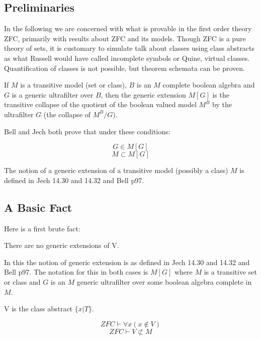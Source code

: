 \documentclass[10pt,titlepage]{article}
\begin{document}
\subsection{Preliminaries}

In the following we are concerned with what is provable in the first order theory ZFC, primarily with results about ZFC and its models.
Though ZFC is a pure theory of sets, it is customary to simulate talk about classes using class abstracts as what Russell would have called incomplete symbols or Quine, virtual classes. 
Quantification of classes is not possible, but theorem schemata can be proven.

If $M$ is a transitive model (set or class), $B$ is an $M$ complete boolean algebra and $G$ is a generic ultrafilter over $B$, then the generic extension $M[G]$ is the transitive collapse of the quotient of the boolean valued model $M^B$ by the ultrafilter $G$ (the collapse of $M^B/G$).
 
Bell and Jech both prove that under these conditions:

\begin{equation}
G \in M[G] \label{2}
\end{equation}
\begin{equation}
M \subset M[G] \label{3}
\end{equation}

The notion of a generic extension of a transitive model (possibly a class) $M$ is defined in Jech 14.30 and 14.32 and Bell p97.

\subsection{A Basic Fact}

Here is a first brute fact:

There are no generic extensions of V.

In this the notion of generic extension is as defined in Jech 14.30 and 14.32 and Bell p97.
The notation for this in both cases is $M[G]$ where $M$ is a transitive set or class and $G$ is an $M$ generic ultrafilter over some boolean algebra complete in $M$.
 
V is the class abstract $\{x | T\}$.

\begin{equation}
ZFC \vdash \forall x (x \not\in V)
\end{equation}
\begin{equation}
ZFC \vdash V \not\subset M
\end{equation}
\end{document}
